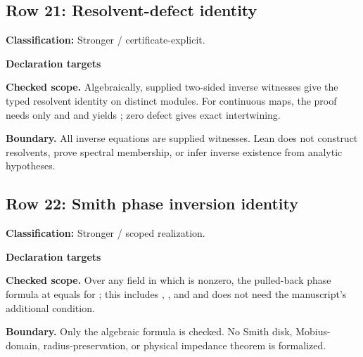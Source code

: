 \subsection{Row 21: Resolvent-defect identity}
\label{row:21}
\textbf{Classification:} Stronger / certificate-explicit.
\par\smallskip\textbf{Declaration targets}\par
{\small\noindent{}\par}
{\small\noindent{}\par}
{\small\noindent{}\par}
{\small\noindent{}\par}
{\small\noindent{}\par}
{\small\noindent{}\par}
{\small\noindent{}\par}
{\small\noindent{}\par}
\smallskip\textbf{Checked scope.} Algebraically, supplied two-sided inverse witnesses give the typed resolvent identity on distinct modules. For continuous maps, the proof needs only  and  and yields ; zero defect gives exact intertwining.
\par\smallskip\textbf{Boundary.} All inverse equations are supplied witnesses. Lean does not construct resolvents, prove spectral membership, or infer inverse existence from analytic hypotheses.
\medskip
{}
\subsection{Row 22: Smith phase inversion identity}
\label{row:22}
\textbf{Classification:} Stronger / scoped realization.
\par\smallskip\textbf{Declaration targets}\par
{\small\noindent{}\par}
{\small\noindent{}\par}
\smallskip\textbf{Checked scope.} Over any field in which  is nonzero, the pulled-back phase formula at  equals  for ; this includes , , and  and does not need the manuscript's additional  condition.
\par\smallskip\textbf{Boundary.} Only the algebraic formula is checked. No Smith disk, Mobius-domain, radius-preservation, or physical impedance theorem is formalized.
\medskip
{}
